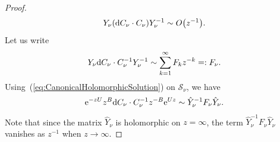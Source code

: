 \documentclass[10pt,a4paper]{amsart}
\numberwithin{equation}{section}
\begin{document}
\begin{proof}
\begin{equation*}
 Y_{\nu}({\rm d}C_{\nu}\cdot C_{\nu})Y_{\nu}^{-1}\sim O\bigl(z^{-1}\bigr).
\end{equation*}
 Let us write
 \begin{equation*}
 Y_{\nu}{\rm d}C_{\nu}\cdot C_{\nu}^{-1}Y_{\nu}^{-1}\sim\sum_{k=1}^{\infty}F_{k}z^{-k}=:F_{\nu}.
 \end{equation*}
 Using~(\ref{eq:CanonicalHolomorphicSolution}) on $\mathcal{S}_{\nu}$, we have
 \begin{equation*}
 {\rm e}^{-zU}z^{B}{\rm d} C_{\nu}\cdot C_{\nu}^{-1}z^{-B}{\rm e}^{Uz}\sim \hat{Y}_{\nu}^{-1}F_{\nu}\hat{Y}_{\nu}.
 \end{equation*}
 Note that since the matrix $\hat{Y}_{\nu}$ is holomorphic on $z=\infty$, the term $\hat{Y}_{\nu}^{-1}F_{\nu}\hat{Y}_{\nu}$ vanishes as $z^{-1}$ when $z\rightarrow\infty$.


\end{proof}
\end{document}
